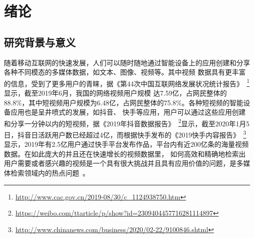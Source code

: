 \chapter{绪论}

\section{研究背景与意义}
随着移动互联网的快速发展，人们可以随时随地通过智能设备上的应用创建和分享各种不同模态的多媒体数据，如文本、图像、视频等。其中视频
数据具有更丰富的信息，受到了更多用户的青睐，据《第44次中国互联网络发展状况统计报告》~\footnote{\url{http://www.cac.gov.cn/2019-08/30/c\_1124938750.htm}}显示，截至2019年6月，我国的网络视频用户规模
达7.59亿，占网民整体的88.8\%，其中短视频用户规模为6.48亿，占网民整体的75.8\%。各种短视频的智能设备应用也是呈井喷式的发展，如抖音、
快手等应用，用户可以通过这些应用创建和分享一分钟以内的短视频，据《2019年抖音数据报告》~\footnote{\url{https://weibo.com/ttarticle/p/show?id=2309404457716281114897}}显示，截至2020年1月5日，抖音日活跃用户数已经超过4亿，而根据快手发布的《2019快手内容报告》~\footnote{\url{http://www.chinanews.com/business/2020/02-22/9100846.shtml}}
显示，2019年有2.5亿用户通过快手平台发布作品，平台内有近200亿条的海量视频数据。在如此庞大的并且还在快速增长的视频数据里，
如何高效和精确地检索出用户需要或者感兴趣的视频是一个具有很大挑战并且具有应用价值的问题，是多媒体检索领域内的热点问题~\cite{hong2017,geetha2008a,hu2011a,peng2018an}。

